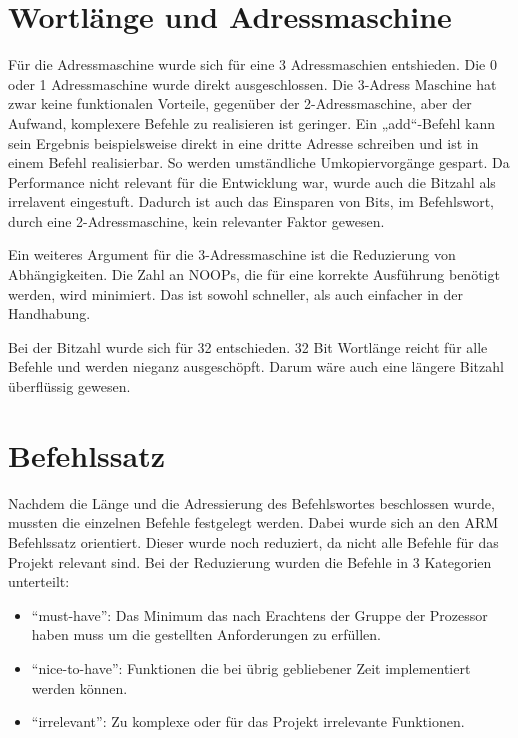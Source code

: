 \documentclass[paper=a4,fontsize=12pt,twocolumn]{scrreprt}
\begin{document}
\kant[5]



\section{Wortlänge und Adressmaschine}

Für die Adressmaschine wurde sich für eine 3 Adressmaschien entshieden. Die 0 oder 1 Adressmaschine wurde direkt ausgeschlossen. 
Die 3-Adress Maschine hat zwar keine funktionalen Vorteile, gegenüber der 2-Adressmaschine, aber der Aufwand, komplexere Befehle zu realisieren ist geringer.
Ein „add“-Befehl kann sein Ergebnis beispielsweise direkt in eine dritte Adresse schreiben und ist in einem Befehl realisierbar. So werden umständliche Umkopiervorgänge gespart.
Da Performance nicht relevant für die Entwicklung war, wurde auch die Bitzahl als irrelavent eingestuft. Dadurch ist auch das Einsparen von Bits, im Befehlswort, durch eine 2-Adressmaschine, kein relevanter Faktor gewesen.

Ein weiteres Argument für die 3-Adressmaschine ist die Reduzierung von Abhängigkeiten. Die Zahl an NOOPs, die für eine korrekte Ausführung benötigt werden, wird minimiert. Das ist sowohl schneller, als auch einfacher in der Handhabung. 

Bei der Bitzahl wurde sich für 32 entschieden. 32 Bit Wortlänge reicht für alle Befehle und werden nieganz ausgeschöpft. Darum wäre auch eine längere Bitzahl überflüssig gewesen. 

\section{Befehlssatz}


Nachdem die Länge und die Adressierung des Befehlswortes beschlossen wurde, mussten die einzelnen Befehle festgelegt werden.
Dabei wurde sich an den ARM Befehlssatz orientiert\footnotemark.
Dieser wurde noch reduziert, da nicht alle Befehle für das Projekt relevant sind.
Bei der Reduzierung wurden die Befehle in 3 Kategorien unterteilt:
\begin{itemize}
    \item \enquote{must-have}:
    Das Minimum das nach Erachtens der Gruppe der Prozessor haben muss um die gestellten Anforderungen zu erfüllen.
    \item \enquote{nice-to-have}:
    Funktionen die bei übrig gebliebener Zeit implementiert werden können.
    \item \enquote{irrelevant}:
    Zu komplexe oder für das Projekt irrelevante Funktionen.
\end{itemize}
\end{document}
